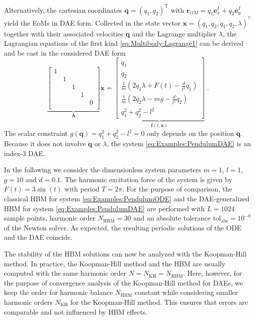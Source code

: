 \documentclass[a4paper, nonatbib, 3p, twocolumn]{elsarticle}
\theoremstyle{plain}
\theoremstyle{definition}
\theoremstyle{remark}
\newcommand{\T}{^{\mathop{\mathrm{T}}}}
\newcommand{\ve}{\mathbf e}
\newcommand{\vf}{\mathbf f}
\newcommand{\vq}{\mathbf q}
\newcommand{\vr}{\mathbf r}
\newcommand{\vx}{\mathbf x}
\newcommand{\vA}{\mathbf A}
\begin{document}
Alternatively, the cartesian coordinates $\vq = (q_1, q_2)\T$ with $\vr_{OM} = q_1\ve_x^I + q_2\ve_y^I$ yield the EoMs in DAE form.
Collected in the state vector $\vx = (q_1,q_2,\dot{q}_1,\dot{q}_2,\lambda)^{\T}$ together with
their associated velocities $\dot{\vq}$ and the Lagrange multiplier $\lambda$, the Lagrangian equations of the first kind \eqref{eq:Multibody:Lagrange1} can be derived and be cast in the considered DAE form
\begin{equation}\label{eq:Examples:PendulumDAE}
	\underbrace{\begin{bmatrix}
		1&&&&\\
		&1&&&\\[3pt]
		&&1&&\\[3pt]
		&&&1&\\[3pt]
		&&&&0\\
	\end{bmatrix}}_\vA\!\dot{\vx}\!=\!\underbrace{\begin{bmatrix}
	\dot{q}_1 \\
	\dot{q}_2 \\[3pt]
	\frac{1}{m}\left(2q_1\lambda+F(t)-\frac{d}{l^2}\dot{q}_1\right)\\[3pt]
    \frac{1}{m}\left(2q_2\lambda-mg-\frac{d}{l^2}\dot{q}_2\right)\\[3pt]
	q_1^2+q_2^2-l^2
	\end{bmatrix}}_{\vf(t,\vx)} \;.
\end{equation}
The scalar constraint $g(\vq)=q_1^2+q_2^2-l^2=0$ only depends on the position $\vq$. Because it does not involve $\dot{\vq}$ or $\lambda$, the system \eqref{eq:Examples:PendulumDAE} is an index-3 DAE.

In the following we consider the dimensionless system parameters $m=1$, $l=1$, $g=10$ and $d=0.1$.
 The harmonic excitation force of the system is given by $F(t)=3\sin(t)$ with period $T=2\pi$.
For the purpose of comparison, the classical HBM for system \eqref{eq:Examples:PendulumODE} and the DAE-generalized HBM for system \eqref{eq:Examples:PendulumDAE} are performed with $L=1024$ sample points, harmonic order $N_\mathrm{HBM}=30$ and an absolute tolerance $\mathrm{tol}_\mathrm{abs}=10^{-8}$ of the Newton solver.
As expected, the resulting periodic solutions of the ODE and the DAE coincide.

The stability of the HBM solutions can now be analyzed with the Koopman-Hill method.
In practice, the Koopman-Hill method and the HBM are usually computed with the same harmonic order $N = N_\mathrm{KH} = N_\mathrm{HBM}$.
Here, however, for the purpose of convergence analysis of the Koopman-Hill method for DAEs, we keep the order for harmonic balance $N_\mathrm{HBM}$ constant while considering smaller harmonic orders $N_\mathrm{KH}$ for the Koopman-Hill method.
This ensures that errors are comparable and not influenced by HBM effects.
\end{document}
